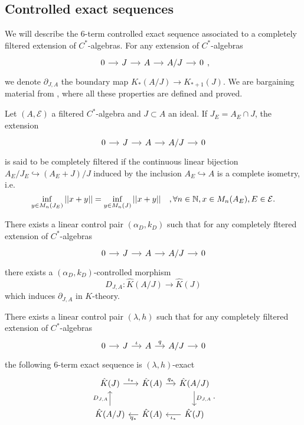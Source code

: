 \subsection{Controlled exact sequences}
We will describe the $6$-term controlled exact sequence associated to a completely filtered extension of $C^*$-algebras. For any extension of $C^*$-algebras 
\[\begin{tikzcd}[column sep = small]0\arrow{r} & J\arrow{r} & A\arrow{r} & A/J\arrow{r} & 0 \end{tikzcd},\]
we denote $\partial_{J,A}$ the boundary map $K_*(A/J)\rightarrow K_{*+1}(J)$. We are bargaining material from \cite{OY2}, where all these properties are defined and proved.\\

\begin{definition}
Let $(A,\mathcal E)$ a filtered $C^*$-algebra and $J\subset A$ an ideal. If $J_E = A_E\cap J$, the extension
\[\begin{tikzcd}[column sep = small]0\arrow{r} & J\arrow{r} & A\arrow{r} & A/J\arrow{r} & 0 \end{tikzcd}\]
is said to be completely filtered if the continuous linear bijection $A_E/J_E \hookrightarrow (A_E+J)/J$ induced by the inclusion $A_E\hookrightarrow A$ is a complete isometry, i.e.
\[ \inf_{y\in M_n(J_E)} ||x+y|| = \inf_{y\in M_n(J)} ||x+y||\quad,\forall n\in \mathbb N,x\in M_n(A_E),E\in \mathcal E.\]
\end{definition}

\begin{prop}
There exists a linear control pair $(\alpha_D,k_D)$ such that for any completely fltered extension of $C^*$-algebras
\[\begin{tikzcd}[column sep = small]0\arrow{r} & J\arrow{r} & A\arrow{r} & A/J\arrow{r} & 0 \end{tikzcd}\]
there exists a $(\alpha_D,k_D)$-controlled morphism 
\[D_{J,A} : \hat K(A/J)\rightarrow \hat K(J)\]
which induces $\partial_{J,A}$ in $K$-theory.
\end{prop}

\begin{thm}
There exists a linear control pair $(\lambda,h)$ such that for any completely filtered extension of $C^*$-algebras 
\[\begin{tikzcd}[column sep = small]0\arrow{r} & J\arrow{r}{\iota} & A\arrow{r}{q} & A/J\arrow{r} & 0 \end{tikzcd}\]
the following $6$-term exact sequence is $(\lambda,h)$-exact
\[\begin{tikzcd}[column sep = small]
 \hat K(J) \arrow{r}{\iota_*} & \hat K(A) \arrow{r}{q_*} & \hat K(A/J)\arrow{d}{D_{J,A}} \\
 \hat K(A/J) \arrow{u}{D_{J,A}} & \hat K(A) \arrow{l}{q_*} & \hat K(J)\arrow{l}{\iota_*}
\end{tikzcd}.\]
\end{thm}

